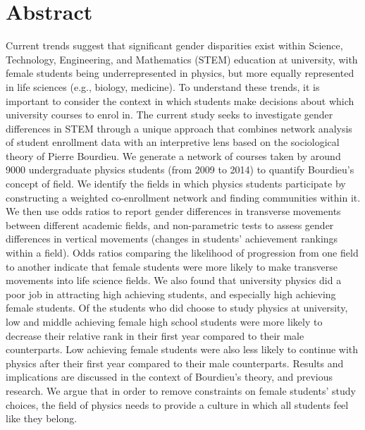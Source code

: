 \section*{Abstract}
Current trends suggest that significant gender disparities exist within Science, Technology, Engineering, and Mathematics (STEM) education at university, with female students being underrepresented in physics, but more equally represented in life sciences (e.g., biology, medicine). To understand these trends, it is important to consider the context in which students make decisions about which university courses to enrol in. The current study seeks to investigate gender differences in STEM through a unique approach that combines network analysis of student enrollment data with an interpretive lens based on the sociological theory of Pierre Bourdieu. We generate a network of courses taken by around 9000 undergraduate physics students (from 2009 to 2014) to quantify Bourdieu's concept of field. We identify the fields in which physics students participate by constructing a weighted co-enrollment network and finding communities within it. We then use odds ratios to report gender differences in transverse movements between different academic fields, and non-parametric tests to assess gender differences in vertical movements (changes in students' achievement rankings within a field). Odds ratios comparing the likelihood of progression from one field to another indicate that female students were more likely to make transverse movements into life science fields. We also found that university physics did a poor job in attracting high achieving students, and especially high achieving female students. Of the students who did choose to study physics at university, low and middle achieving female high school students were more likely to decrease their relative rank in their first year compared to their male counterparts. Low achieving female students were also less likely to continue with physics after their first year compared to their male counterparts. Results and implications are discussed in the context of Bourdieu's theory, and previous research. We argue that in order to remove constraints on female students' study choices, the field of physics needs to provide a culture in which all students feel like they belong.



